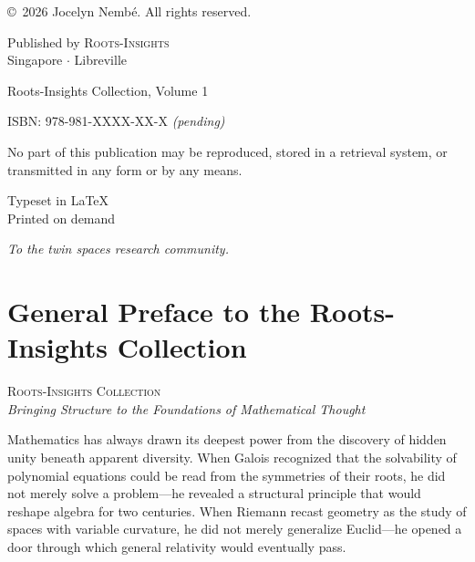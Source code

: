 \documentclass[11pt,a4paper,openany]{book}
\theoremstyle{plain}
\theoremstyle{definition}
\begin{document}
\thispagestyle{empty}
\vspace*{\fill}

\begin{small}
\noindent\copyright\ 2026 Jocelyn Nemb\'e. All rights reserved.

\vspace{1em}
\noindent Published by \textsc{Roots-Insights}\\
Singapore $\cdot$ Libreville

\vspace{1em}
\noindent Roots-Insights Collection, Volume 1

\vspace{1em}
\noindent ISBN: 978-981-XXXX-XX-X \textit{(pending)}

\vspace{1em}
\noindent No part of this publication may be reproduced, stored in a retrieval system,
or transmitted in any form or by any means.

\vspace{1em}
\noindent Typeset in \LaTeX\\
Printed on demand
\end{small}

\vspace*{\fill}

\cleardoublepage

\thispagestyle{empty}
\vspace*{3cm}
\begin{center}
\textit{To the twin spaces research community.}
\end{center}
\vspace*{\fill}

\cleardoublepage

\chapter*{General Preface to the Roots-Insights Collection}

\begin{center}
\textsc{Roots-Insights Collection}\\[0.5em]
\textit{Bringing Structure to the Foundations of Mathematical Thought}
\end{center}

\bigskip

Mathematics has always drawn its deepest power from the discovery of hidden unity beneath apparent diversity. When Galois recognized that the solvability of polynomial equations could be read from the symmetries of their roots, he did not merely solve a problem---he revealed a structural principle that would reshape algebra for two centuries. When Riemann recast geometry as the study of spaces with variable curvature, he did not merely generalize Euclid---he opened a door through which general relativity would eventually pass.
\end{document}
